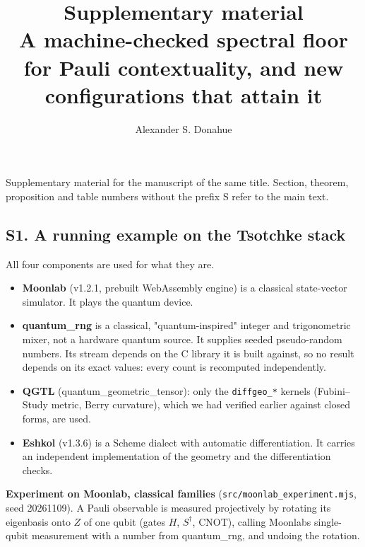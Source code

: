 \documentclass[11pt,a4paper]{article}
\title{Supplementary material\\[0.5em]\large A machine-checked spectral floor for Pauli contextuality, and new configurations that attain it}
\author{Alexander S. Donahue}
\date{}
\providecommand{\tightlist}{\setlength{\itemsep}{0pt}\setlength{\parskip}{0pt}}
\begin{document}
\maketitle
Supplementary material for the manuscript of the same title. Section, theorem, proposition and table numbers without the prefix S refer to the main text.

\subsection{S1. A running example on the Tsotchke stack}\label{s1-a-running-example-on-the-tsotchke-stack}

All four components are used for what they are.

\begin{itemize}
\tightlist
\item
  \textbf{Moonlab} (v1.2.1, prebuilt WebAssembly engine) is a classical state-vector simulator. It plays
  the quantum device.
\item
  \textbf{quantum\_rng} is a classical, "quantum-inspired" integer and trigonometric mixer, not a hardware
  quantum source. It supplies seeded pseudo-random numbers. Its stream depends on the C library it is
  built against, so no result depends on its exact values: every count is recomputed independently.
\item
  \textbf{QGTL} (quantum\_geometric\_tensor): only the \texttt{diffgeo\_*} kernels (Fubini--Study metric, Berry
  curvature), which we had verified earlier against closed forms, are used.
\item
  \textbf{Eshkol} (v1.3.6) is a Scheme dialect with automatic differentiation. It carries an independent
  implementation of the geometry and the differentiation checks.
\end{itemize}

\textbf{Experiment on Moonlab, classical families} (\texttt{src/moonlab\_experiment.mjs}, seed 20261109). A Pauli
observable is measured projectively by rotating its eigenbasis onto \(Z\) of one qubit (gates \(H\),
\(S^\dagger\), CNOT), calling Moonlab\textquotesingle s single-qubit measurement with a number from quantum\_rng, and
undoing the rotation.
\end{document}
